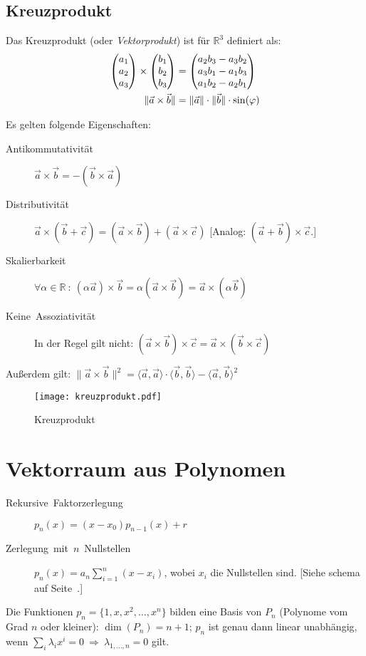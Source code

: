 \subsection{Kreuzprodukt\label{subsec:Kreuzprodukt}}

Das Kreuzprodukt (oder \emph{Vektorprodukt}) ist für $\mathbb{R}^{3}$ definiert als:
\begin{align*}
  \veccc(a_1;a_2;a_3)
  \times
  \veccc(b_1;b_2;b_3)
  &
  =\veccc(
    a_2 b_3 - a_3 b_2;
    a_3 b_1 - a_1 b_3;
    a_1 b_2 - a_2 b_1)
  \\
  \lVert \vec{a}\times\vec{b} \rVert
  &
  =\lVert\vec{a}\rVert \cdot \lVert\vec{b}\rVert \cdot \sin(\varphi)
\end{align*}


Es gelten folgende Eigenschaften:
\begin{description}
  \item [{Antikommutativität}]
	$\vec{a}\times\vec{b} = -(\vec{b}\times\vec{a})$
  \item [{Distributivität}]
	$\vec{a}\times(\vec{b}+\vec{c}) = (\vec{a}\times\vec{b}) + (\vec{a}\times\vec{c})$
	[Analog: $(\vec{a} + \vec{b}) \times \vec{c}$.]
  \item [{Skalierbarkeit}]
	$\forall\alpha\in\mathbb{R}
	  \ :\ 
	  (\alpha\vec{a}) \times \vec{b} = \alpha(\vec{a}\times\vec{b}) = \vec{a}\times(\alpha\vec{b})$
  \item [{Keine~Assoziativität}]
	In der Regel gilt nicht: $(\vec{a}\times\vec{b}) \times \vec{c} = \vec{a}\times(\vec{b}\times\vec{c})$
\end{description}
Außerdem gilt:
$\lVert \vec{a}\times\vec{b} \rVert^2 =
\langle \vec{a},\vec{a} \rangle
\cdot
\langle \vec{b},\vec{b} \rangle
-
\langle \vec{a},\vec{b} \rangle ^2$

\begin{figure}[H]
\centering\texttt{[image: kreuzprodukt.pdf]}

\caption{Kreuzprodukt}
\end{figure}



\section{Vektorraum aus Polynomen}
\begin{description}
  \item [{Rekursive~Faktorzerlegung}] 
    $p_n(x) = (x-x_0) p_{n-1}(x) + r$
  \item [{Zerlegung~mit~$n$~Nullstellen}] 
    $p_n(x) = a_n\sum_{i=1}^n (x-x_i)$, wobei $x_i$ die Nullstellen sind.
    [Siehe \noun{Horner}schema auf Seite~\pageref{hornerschema}.]
\end{description}
Die Funktionen $p_n = \{1,x,x^2,\dots,x^n\}$ bilden eine Basis von $P_n$ (Polynome vom Grad $n$ oder kleiner): $\dim(P_n)=n+1$; $p_n$ ist genau dann linear unabhängig, wenn $\sum_i \lambda_i x^i = 0 \: \Rightarrow \: \lambda_{1,\ldots,n} = 0$ gilt.


